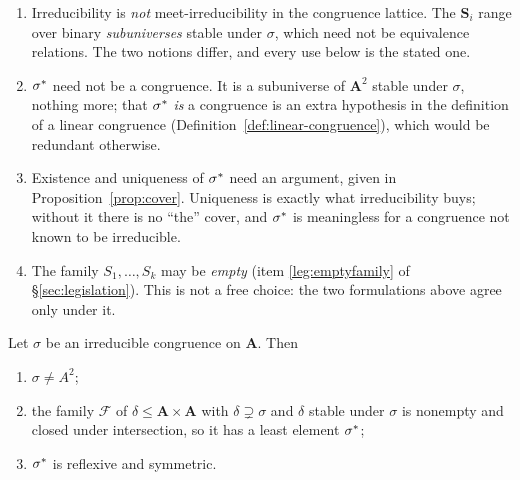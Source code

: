 \begin{hazard}\label{haz:irreducible}
\begin{enumerate}\alphlabels\tightlist
\item Irreducibility is \emph{not} meet-irreducibility in the congruence
  lattice. The $\mathbf S_{i}$ range over binary \emph{subuniverses} stable
  under $\sigma$, which need not be equivalence relations. The two notions
  differ, and every use below is the stated one.
\item $\sigma^{*}$ need not be a congruence. It is a subuniverse of
  $\mathbf A^{2}$ stable under $\sigma$, nothing more; that $\sigma^{*}$
  \emph{is} a congruence is an extra hypothesis in the definition of a linear
  congruence (Definition~\ref{def:linear-congruence}), which would be
  redundant otherwise.
\item Existence and uniqueness of $\sigma^{*}$ need an argument, given in
  Proposition~\ref{prop:cover}. Uniqueness is exactly what irreducibility buys;
  without it there is no ``the'' cover, and $\sigma^{*}$ is meaningless for
  a congruence not known to be irreducible.
\item The family $S_{1},\dots,S_{k}$ may be \emph{empty}
  (item \ref{leg:emptyfamily} of
  \S\ref{sec:legislation}). This is not a free choice: the two formulations
  above agree only under it.
\end{enumerate}
\end{hazard}

\begin{proposition}\label{prop:cover}
Let $\sigma$ be an irreducible congruence on $\mathbf A$. Then
\begin{enumerate}\alphlabels\tightlist
\item $\sigma\neq A^{2}$;
\item the family $\mathcal F$ of $\delta\le\mathbf A\times\mathbf A$ with
  $\delta\supsetneq\sigma$ and $\delta$ stable under $\sigma$ is nonempty and
  closed under intersection, so it has a least element $\sigma^{*}$;
\item $\sigma^{*}$ is reflexive and symmetric.
\end{enumerate}
\end{proposition}

